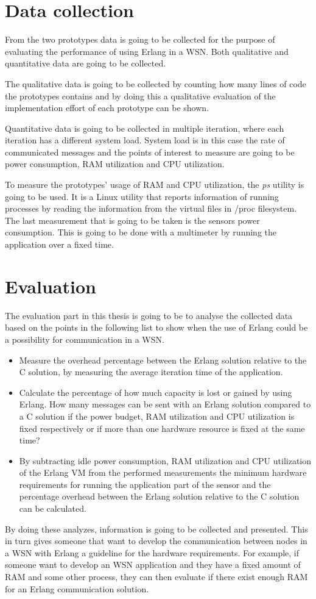 \section{Data collection}
From the two prototypes data is going to be collected for the purpose of evaluating the performance of using Erlang in a WSN. Both qualitative and quantitative data are going to be collected.

The qualitative data is going to be collected by counting how many lines of code the prototypes contains and by doing this a qualitative evaluation of the implementation effort of each prototype can be shown.

Quantitative data is going to be collected in multiple iteration, where each iteration has a different system load. System load is in this case the rate of communicated messages and the points of interest to measure are going to be power consumption, RAM utilization and CPU utilization. 

To measure the prototypes’ usage of RAM and CPU utilization, the \textit{ps} utility is going to be used. It is a Linux utility that reports information of running processes by reading the information from the virtual files in /proc filesystem. The last measurement that is going to be taken is the sensors power consumption. This is going to be done with a multimeter by running the application over a fixed time.  

\section{Evaluation}\label{sec:evaluation}
The evaluation part in this thesis is going to be to analyse the collected data based on the points in the following list to show when the use of Erlang could be a possibility for communication in a WSN.

\begin{itemize}
    \item Measure the overhead percentage between the Erlang solution relative to the C solution, by measuring the average iteration time of the application. 
    \item Calculate the percentage of how much capacity is lost or gained by using Erlang. How many messages can be sent with an Erlang solution compared to a C solution if the power budget, RAM utilization and CPU utilization is fixed respectively or if more than one hardware resource is fixed at the same time? 
    \item By subtracting idle power consumption, RAM utilization and CPU utilization of the Erlang VM from the performed measurements the minimum hardware requirements for running the application part of the sensor and the percentage overhead between the Erlang solution relative to the C solution can be calculated. 
\end{itemize}

By doing these analyzes, information is going to be collected and presented. This in turn gives someone that want to develop the communication between nodes in a WSN with Erlang a guideline for the hardware requirements. For example, if someone want to develop an WSN application and they have a fixed amount of RAM and some other process, they can then evaluate if there exist enough RAM for an Erlang communication solution.
